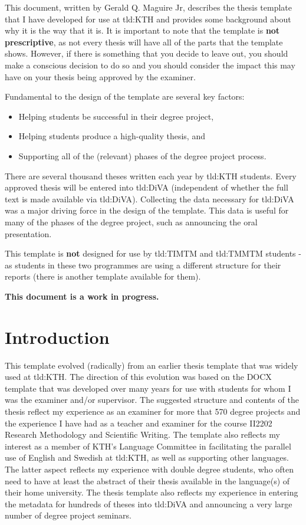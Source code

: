 \glsresetall[readme]
This document, written by Gerald Q. Maguire Jr,  describes the thesis template that I have developed for use at \gls{tld:KTH} and provides some background about why it is the way that it is. It is important to note that the template is \textbf{not prescriptive}, as not every thesis will have all of the parts that the template shows. However, if there is something that you decide to leave out, you should make a conscious decision to do so and you should consider the impact this may have on your thesis being approved by the examiner.

Fundamental to the design of the template are several key factors:
\begin{itemize}
    \item Helping students be successful in their degree project,
    \item Helping students produce a high-quality thesis, and
    \item Supporting all of the (relevant) phases of the degree project process.
\end{itemize}

There are several thousand theses written each year by \gls{tld:KTH} students. Every approved thesis will be entered into \gls{tld:DiVA} (independent of whether the full text is made available via \gls{tld:DiVA}). Collecting the data necessary for \gls{tld:DiVA} was a major driving force in the design of the template. This data is useful for many of the phases of the degree project, such as announcing the oral presentation.
    
This template is \textbf{not} designed for use by \gls{tld:TIMTM} and \gls{tld:TMMTM} students - as students in these two programmes are using a different structure for their reports (there is another template available for them).

\textbf{This document is a work in progress.}

\section{Introduction}
This template evolved (radically) from an earlier thesis template that was widely used at \gls{tld:KTH}. The direction of this evolution was based on the DOCX template that was developed over many years for use with students for whom I was the examiner and/or supervisor. The suggested structure and contents of the thesis reflect my experience as an examiner for more that 570 degree projects and the experience I have had as a teacher and examiner for the course II2202 Research Methodology and Scientific Writing. The template also reflects my interest as a member of KTH's Language Committee in facilitating the parallel use of English and Swedish at \gls{tld:KTH}, as well as supporting other languages. The latter aspect
reflects my experience with double degree students, who often need to have at least the abstract of their thesis available in the language(s) of their home university. The thesis template also reflects
my experience in entering the metadata for hundreds of theses into \gls{tld:DiVA} and announcing a very large number of degree project seminars.

